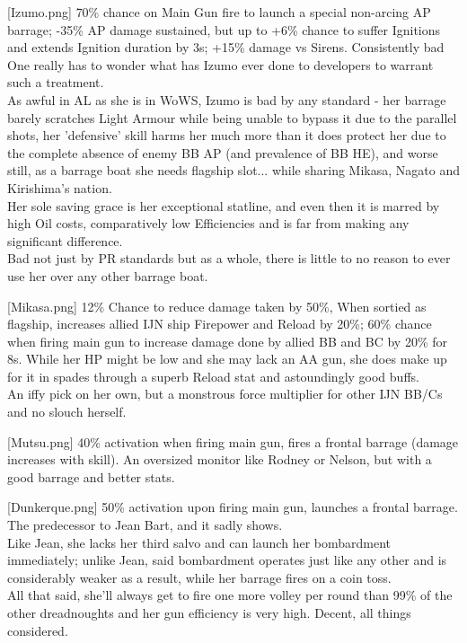 [Izumo.png]
{70\% chance on Main Gun fire to launch a special non-arcing AP barrage; -35\% AP damage sustained, but up to +6\% chance to suffer Ignitions and extends Ignition duration by 3s; +15\% damage vs Sirens.}
{Consistently bad}
{One really has to wonder what has Izumo ever done to developers to warrant such a treatment.\\
As awful in AL as she is in WoWS, Izumo is bad by any standard - her barrage barely scratches Light Armour while being unable to bypass it due to the parallel shots, her 'defensive' skill harms her much more than it does protect her due to the complete absence of enemy BB AP (and prevalence of BB HE), and worse still, as a barrage boat she needs flagship slot... while sharing Mikasa, Nagato and Kirishima's nation.\\
Her sole saving grace is her exceptional statline, and even then it is marred by high Oil costs, comparatively low Efficiencies and is far from making any significant difference.\\
Bad not just by PR standards but as a whole, there is little to no reason to ever use her over any other barrage boat.}

[Mikasa.png]
{12\% Chance to reduce damage taken by 50\%, When sortied as flagship, increases allied IJN ship Firepower and Reload by 20\%; 60\% chance when firing main gun to increase damage done by allied BB and BC by 20\% for 8s.}
{}
{While her HP might be low and she may lack an AA gun, she does make up for it in spades through a superb Reload stat and astoundingly good buffs.\\
An iffy pick on her own, but a monstrous force multiplier for other IJN BB/Cs and no slouch herself. }

[Mutsu.png]
{40\% activation when firing main gun, fires a frontal barrage (damage increases with skill).}
{}
{An oversized monitor like Rodney or Nelson, but with a good barrage and better stats.}
 
[Dunkerque.png]
{50\% activation upon firing main gun, launches a frontal barrage. }
{}
{The predecessor to Jean Bart, and it sadly shows.\\
Like Jean, she lacks her third salvo and can launch her bombardment immediately; unlike Jean, said bombardment operates just like any other and is considerably weaker as a result, while her barrage fires on a coin toss.\\
All that said, she'll always get to fire one more volley per round than 99\% of the other dreadnoughts and her gun efficiency is very high. Decent, all things considered.}


